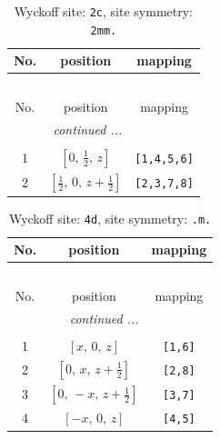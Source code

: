 \documentclass[fleqn,8pt]{jsarticle}
\begin{document}
\renewcommand{\arraystretch}{1.2}
\begin{longtable}{ccc}
\caption{Wyckoff site: {\tt 2c}, site symmetry: {\tt 2mm.}}
 \\
 \hline \hline
No. & position & mapping \\ \hline \endfirsthead

\multicolumn{2}{l}{\tablename\ \thetable{}} \\
 \hline \hline
No. & position & mapping \\ \hline \endhead

 \hline \hline
\multicolumn{2}{r}{\footnotesize\it continued ...} \\ \endfoot

 \hline \hline
\multicolumn{2}{r}{} \\ \endlastfoot

1 & $\left[ 0,\, \frac{1}{2},\, z \right]$ & {\tt [1,4,5,6]} \\ \hline
2 & $\left[ \frac{1}{2},\, 0,\, z + \frac{1}{2} \right]$ & {\tt [2,3,7,8]} \\
\end{longtable}
\renewcommand{\arraystretch}{1.2}
\begin{longtable}{ccc}
\caption{Wyckoff site: {\tt 4d}, site symmetry: {\tt .m.}}
 \\
 \hline \hline
No. & position & mapping \\ \hline \endfirsthead

\multicolumn{2}{l}{\tablename\ \thetable{}} \\
 \hline \hline
No. & position & mapping \\ \hline \endhead

 \hline \hline
\multicolumn{2}{r}{\footnotesize\it continued ...} \\ \endfoot

 \hline \hline
\multicolumn{2}{r}{} \\ \endlastfoot

1 & $\left[ x,\, 0,\, z \right]$ & {\tt [1,6]} \\ \hline
2 & $\left[ 0,\, x,\, z + \frac{1}{2} \right]$ & {\tt [2,8]} \\ \hline
3 & $\left[ 0,\, - x,\, z + \frac{1}{2} \right]$ & {\tt [3,7]} \\ \hline
4 & $\left[ - x,\, 0,\, z \right]$ & {\tt [4,5]} \\
\end{longtable}
\renewcommand{\arraystretch}{1.2}
\end{document}
